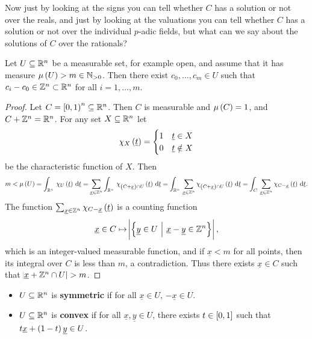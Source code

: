 Now just by looking at the signs you can tell whether $ C $ has a solution or not over the reals, and just by looking at the valuations you can tell whether $ C $ has a solution or not over the individual $ p $-adic fields, but what can we say about the solutions of $ C $ over the rationals?

\begin{lemma}
\label{lem:5.1}
Let $ U \subseteq \mathbb{R}^n $ be a measurable set, for example open, and assume that it has measure $ \mu\br{U} > m \in \NN_{> 0} $. Then there exist $ c_0, \dots, c_m \in U $ such that $ c_i - c_0 \in \mathbb{Z}^n \subset \mathbb{R}^n $ for all $ i = 1, \dots, m $.
\end{lemma}

\begin{proof}
Let $ C = \intco{0, 1}^n \subseteq \RR^n $. Then $ C $ is measurable and $ \mu\br{C} = 1 $, and $ C + \mathbb{Z}^n = \mathbb{R}^n $. For any set $ X \subseteq \mathbb{R}^n $ let
$$ \chi_X\br{\underline{t}} =
\begin{cases}
1 & \underline{t} \in X \\
0 & \underline{t} \notin X
\end{cases}
$$
be the characteristic function of $ X $. Then
$$ m < \mu\br{U} = \intd{\RR^n}{}{\chi_U\br{\underline{t}}}{\underline{t}} = \sum_{\underline{x} \in \ZZ^n} \intd{\RR^n}{}{\chi_{\br{C + \underline{x}} \cap U}\br{\underline{t}}}{\underline{t}} = \intd{\RR^n}{}{\sum_{\underline{x} \in \ZZ^n} \chi_{\br{C + \underline{x}} \cap U}\br{\underline{t}}}{\underline{t}} = \intd{C}{}{\sum_{\underline{x} \in \ZZ^n} \chi_{C - \underline{x}}\br{\underline{t}}}{\underline{t}}. $$
The function $ \sum_{\underline{x} \in \ZZ^n} \chi_{C - \underline{x}}\br{\underline{t}} $ is a counting function
$$ \underline{x} \in C \mapsto \abs{\cbr{\underline{y} \in U \st \underline{x} - \underline{y} \in \ZZ^n}}, $$
which is an integer-valued measurable function, and if $ \underline{x} < m $ for all points, then its integral over $ C $ is less than $ m $, a contradiction. Thus there exists $ \underline{x} \in C $ such that $ \abs{\underline{x} + \mathbb{Z}^n \cap U} > m $.
\end{proof}

\pagebreak

\begin{definition}
\hfill
\begin{itemize}
\item $ U \subseteq \mathbb{R}^n $ is \textbf{symmetric} if for all $ \underline{x} \in U $, $ -\underline{x} \in U $.
\item $ U \subseteq \mathbb{R}^n $ is \textbf{convex} if for all $ \underline{x}, \underline{y} \in U $, there exists $ t \in \sbr{0, 1} $ such that $ t\underline{x} + \br{1 - t}\underline{y} \in U $.
\end{itemize}
\end{definition}

